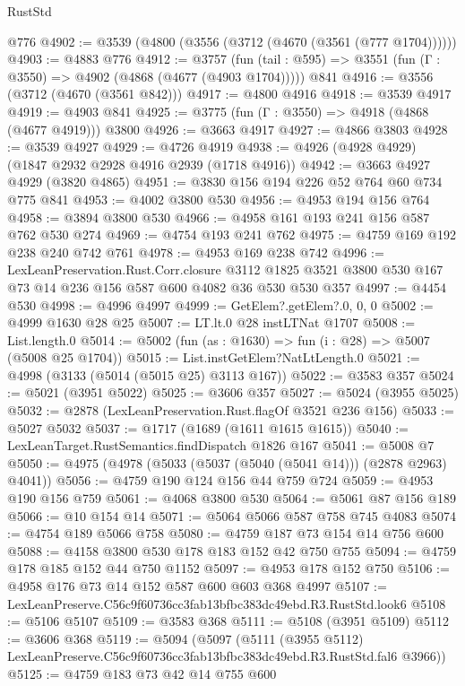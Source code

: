\begin{lexlean}{RustStd}
\begin{coremodule}
    @776
@4902 := @3539 (@4800 (@3556 (@3712 (@4670 (@3561 (@777 @1704))))))
@4903 := @4883 @776
@4912 := @3757
    (fun (tail : @595) => @3551 (fun (Γ : @3550) => @4902 (@4868 (@4677 (@4903 @1704)))))
    @841
@4916 := @3556 (@3712 (@4670 (@3561 @842)))
@4917 := @4800 @4916
@4918 := @3539 @4917
@4919 := @4903 @841
@4925 := @3775 (fun (Γ : @3550) => @4918 (@4868 (@4677 @4919))) @3800
@4926 := @3663 @4917
@4927 := @4866 @3803
@4928 := @3539 @4927
@4929 := @4726 @4919
@4938 := @4926 (@4928 @4929) (@1847 @2932 @2928 @4916 @2939 (@1718 @4916))
@4942 := @3663 @4927 @4929 (@3820 @4865)
@4951 := @3830 @156 @194 @226 @52 @764 @60 @734 @775 @841
@4953 := @4002 @3800 @530
@4956 := @4953 @194 @156 @764
@4958 := @3894 @3800 @530
@4966 := @4958 @161 @193 @241 @156 @587 @762 @530 @274
@4969 := @4754 @193 @241 @762
@4975 := @4759 @169 @192 @238 @240 @742 @761
@4978 := @4953 @169 @238 @742
@4996 := LexLeanPreservation.Rust.Corr.closure
    @3112
    @1825
    @3521
    @3800
    @530
    @167
    @73
    @14
    @236
    @156
    @587
    @600
    @4082
    @36
    @530
    @530
    @357
@4997 := @4454 @530
@4998 := @4996 @4997
@4999 := GetElem?.getElem?.{0, 0, 0}
@5002 := @4999 @1630 @28 @25
@5007 := LT.lt.{0} @28 instLTNat @1707
@5008 := List.length.{0}
@5014 := @5002 (fun (as : @1630) => fun (i : @28) => @5007 (@5008 @25 @1704))
@5015 := List.instGetElem?NatLtLength.{0}
@5021 := @4998 (@3133 (@5014 (@5015 @25) @3113 @167))
@5022 := @3583 @357
@5024 := @5021 (@3951 @5022)
@5025 := @3606 @357
@5027 := @5024 (@3955 @5025)
@5032 := @2878 (LexLeanPreservation.Rust.flagOf @3521 @236 @156)
@5033 := @5027 @5032
@5037 := @1717 (@1689 (@1611 @1615 @1615))
@5040 := LexLeanTarget.RustSemantics.findDispatch @1826 @167
@5041 := @5008 @7
@5050 := @4975 (@4978 (@5033 (@5037 (@5040 (@5041 @14))) (@2878 @2963) @4041))
@5056 := @4759 @190 @124 @156 @44 @759 @724
@5059 := @4953 @190 @156 @759
@5061 := @4068 @3800 @530
@5064 := @5061 @87 @156 @189
@5066 := @10 @154 @14
@5071 := @5064 @5066 @587 @758 @745 @4083
@5074 := @4754 @189 @5066 @758
@5080 := @4759 @187 @73 @154 @14 @756 @600
@5088 := @4158 @3800 @530 @178 @183 @152 @42 @750 @755
@5094 := @4759 @178 @185 @152 @44 @750 @1152
@5097 := @4953 @178 @152 @750
@5106 := @4958 @176 @73 @14 @152 @587 @600 @603 @368 @4997
@5107 := LexLeanPreserve.C56c9f60736cc3fab13bfbc383dc49ebd.R3.RustStd.look6
@5108 := @5106 @5107
@5109 := @3583 @368
@5111 := @5108 (@3951 @5109)
@5112 := @3606 @368
@5119 := @5094
    (@5097
      (@5111 (@3955 @5112) LexLeanPreserve.C56c9f60736cc3fab13bfbc383dc49ebd.R3.RustStd.fal6 @3966))
@5125 := @4759 @183 @73 @42 @14 @755 @600

\end{coremodule}
\end{lexlean}
